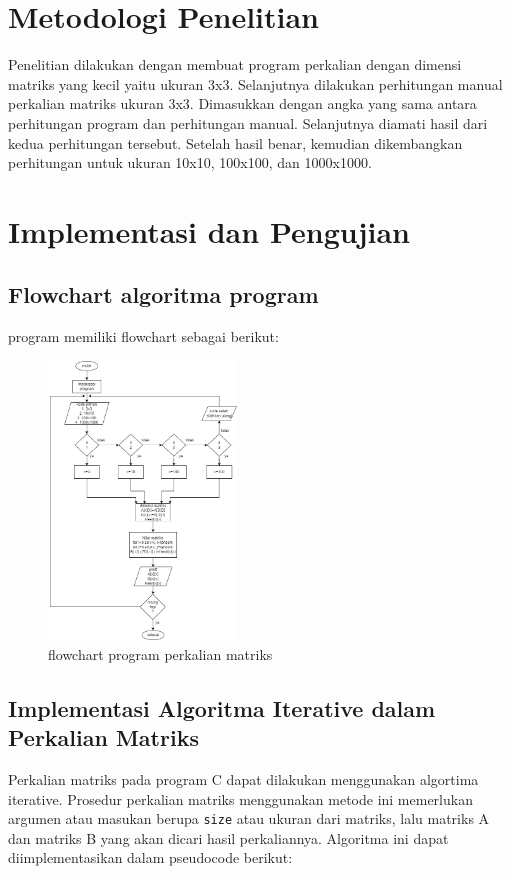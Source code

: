 \documentclass[conference]{IEEEtran}
\begin{document}
\section{Metodologi Penelitian}
Penelitian dilakukan dengan membuat program perkalian dengan dimensi matriks 
yang kecil yaitu ukuran 3x3. Selanjutnya dilakukan perhitungan manual perkalian
 matriks ukuran 3x3. Dimasukkan dengan angka yang sama antara perhitungan program
  dan perhitungan manual. Selanjutnya diamati hasil dari kedua perhitungan
   tersebut. Setelah hasil benar, kemudian dikembangkan perhitungan untuk 
   ukuran 10x10, 100x100, dan 1000x1000.

\begin{center}
\end{center}

\section{Implementasi dan Pengujian}

\subsection{Flowchart algoritma program}
program memiliki flowchart sebagai berikut:

\begin{figure}[htbp]
    \includegraphics[width=5cm]{flowchart.jpg}
    \centering
    \caption{flowchart program perkalian matriks}        
\end{figure}

\subsection{Implementasi Algoritma Iterative dalam Perkalian Matriks}
Perkalian matriks pada program C dapat dilakukan menggunakan algortima iterative.
Prosedur perkalian matriks menggunakan metode ini memerlukan argumen atau masukan 
berupa \texttt{size} atau ukuran dari matriks, lalu matriks A dan matriks B yang akan
dicari hasil perkaliannya. Algoritma ini dapat diimplementasikan dalam pseudocode berikut:
\end{document}
